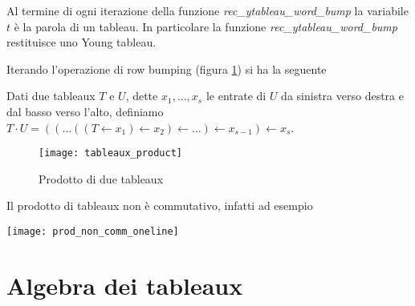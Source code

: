 \begin{oss}
Al termine di ogni iterazione della funzione
\emph{rec\_ytableau\_word\_bump} la variabile $t$ \`e la parola di un
tableau. In particolare la funzione \emph{rec\_ytableau\_word\_bump}
restituisce uno Young tableau.
\end{oss}

Iterando l'operazione di row bumping (figura \ref{fig:tab_prod}) si ha la seguente

\begin{defn}
Dati due tableaux $T$ e $U$, dette $x_1,\ldots , x_s$ le entrate di
$U$ da sinistra verso destra e dal basso verso l'alto, definiamo
$T \cdot U = (( \ldots ((T \gets x_1) \gets x_2 ) \gets \ldots ) \gets x_{s-1} )
\gets x_s$.
\end{defn} 

\begin{figure}[h]
\centering
\texttt{[image: tableaux\_product]}
\caption{Prodotto di due tableaux}
\label{fig:tab_prod}
\end{figure}
\newpage
\begin{oss}
Il prodotto di tableaux non \`e commutativo, infatti ad esempio
\begin{center}
\texttt{[image: prod\_non\_comm\_oneline]}
\end{center}
\end{oss}

\section{Algebra dei tableaux}

